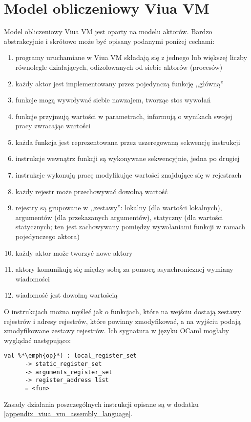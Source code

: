 \chapter{Model obliczeniowy Viua VM}
\label{appendix_viua_vm_execution_model}

Model obliczeniowy Viua VM jest oparty na modelu aktorów. Bardzo abstrakcyjnie i
skrótowo może być opisany podanymi poniżej cechami:

\begin{enumerate}
\item programy uruchamiane w Viua VM składają się z jednego lub większej liczby
    równolegle działających, odizolowanych od siebie aktorów (procesów)
\item każdy aktor jest implementowany przez pojedynczą funkcję ,,główną''
\item funkcje mogą wywoływać siebie nawzajem, tworząc stos wywołań
\item funkcje przyjmują wartości w parametrach, informują o wynikach swojej
    pracy zwracając wartości
\item każda funkcja jest reprezentowana przez uszeregowaną sekwencję instrukcji
\item instrukcje wewnątrz funkcji są wykonywane sekwencyjnie, jedna po drugiej
\item instrukcje wykonują pracę modyfikując wartości znajdujące się w rejestrach
\item każdy rejestr może przechowywać dowolną wartość
\item rejestry są grupowane w ,,zestawy'': lokalny (dla wartości lokalnych),
    argumentów (dla przekazanych argumentów), statyczny (dla wartości
    statycznych; ten jest zachowywany pomiędzy wywołaniami funkcji w ramach
    pojedynczego aktora)
\item każdy aktor może tworzyć nowe aktory
\item aktory komunikują się między sobą za pomocą asynchronicznej wymiany
    wiadomości
\item wiadomość jest dowolną wartością
\end{enumerate}

O instrukcjach można myśleć jak o funkcjach, które na wejściu dostają zestawy
rejestrów i adresy rejestrów, które powinny zmodyfikować, a na wyjściu podają
zmodyfikowane zestawy rejestrów. Ich sygnatura w języku OCaml mogłaby wyglądać
następująco:

\begin{lstlisting}
val %*\emph{op}*) : local_register_set
      -> static_register_set
      -> arguments_register_set
      -> register_address list
      = <fun>
\end{lstlisting}

Zasady działania poszczególnych instrukcji opisane są w dodatku \ref{appendix_viua_vm_assembly_language}.
